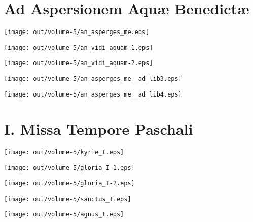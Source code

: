 \documentclass{book}
\begin{document}
\part{Ad Aspersionem Aquæ Benedictæ}

\texttt{[image: out/volume-5/an\_asperges\_me.eps]}

\texttt{[image: out/volume-5/an\_vidi\_aquam-1.eps]}

\texttt{[image: out/volume-5/an\_vidi\_aquam-2.eps]}

\texttt{[image: out/volume-5/an\_asperges\_me\_\_ad\_lib3.eps]}

\texttt{[image: out/volume-5/an\_asperges\_me\_\_ad\_lib4.eps]}

\pagebreak

\part{I. Missa Tempore Paschali}

\texttt{[image: out/volume-5/kyrie\_I.eps]}

\texttt{[image: out/volume-5/gloria\_I-1.eps]}

\texttt{[image: out/volume-5/gloria\_I-2.eps]}

\texttt{[image: out/volume-5/sanctus\_I.eps]}

\texttt{[image: out/volume-5/agnus\_I.eps]}

\pagebreak
\end{document}

